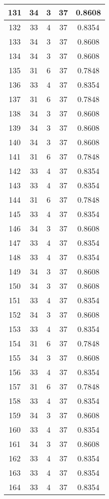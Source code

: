 \documentclass[letterpaper, 12pt]{article}
\begin{document}
\begin{longtable}{|c|c|c|c|c|}
\hline
131 & 34 & 3 & 37 & 0.8608 \\
\hline
132 & 33 & 4 & 37 & 0.8354 \\
\hline
133 & 34 & 3 & 37 & 0.8608 \\
\hline
134 & 34 & 3 & 37 & 0.8608 \\
\hline
135 & 31 & 6 & 37 & 0.7848 \\
\hline
136 & 33 & 4 & 37 & 0.8354 \\
\hline
137 & 31 & 6 & 37 & 0.7848 \\
\hline
138 & 34 & 3 & 37 & 0.8608 \\
\hline
139 & 34 & 3 & 37 & 0.8608 \\
\hline
140 & 34 & 3 & 37 & 0.8608 \\
\hline
141 & 31 & 6 & 37 & 0.7848 \\
\hline
142 & 33 & 4 & 37 & 0.8354 \\
\hline
143 & 33 & 4 & 37 & 0.8354 \\
\hline
144 & 31 & 6 & 37 & 0.7848 \\
\hline
145 & 33 & 4 & 37 & 0.8354 \\
\hline
146 & 34 & 3 & 37 & 0.8608 \\
\hline
147 & 33 & 4 & 37 & 0.8354 \\
\hline
148 & 33 & 4 & 37 & 0.8354 \\
\hline
149 & 34 & 3 & 37 & 0.8608 \\
\hline
150 & 34 & 3 & 37 & 0.8608 \\
\hline
151 & 33 & 4 & 37 & 0.8354 \\
\hline
152 & 34 & 3 & 37 & 0.8608 \\
\hline
153 & 33 & 4 & 37 & 0.8354 \\
\hline
154 & 31 & 6 & 37 & 0.7848 \\
\hline
155 & 34 & 3 & 37 & 0.8608 \\
\hline
156 & 33 & 4 & 37 & 0.8354 \\
\hline
157 & 31 & 6 & 37 & 0.7848 \\
\hline
158 & 33 & 4 & 37 & 0.8354 \\
\hline
159 & 34 & 3 & 37 & 0.8608 \\
\hline
160 & 33 & 4 & 37 & 0.8354 \\
\hline
161 & 34 & 3 & 37 & 0.8608 \\
\hline
162 & 33 & 4 & 37 & 0.8354 \\
\hline
163 & 33 & 4 & 37 & 0.8354 \\
\hline
164 & 33 & 4 & 37 & 0.8354 \\

\end{longtable}
\end{document}
